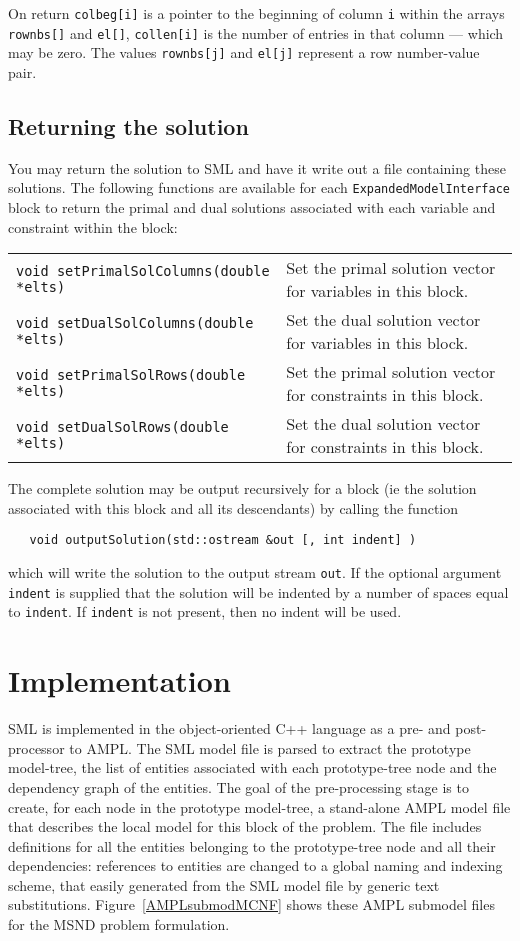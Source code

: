 \documentclass[10pt,a4paper]{book}
\begin{document}
\begin{verbtaim}
On return {\tt colbeg[i]} is a pointer to the beginning of column {\tt i}
within the arrays {\tt rownbs[]} and {\tt el[]}, {\tt collen[i]} is the number
of entries in that column --- which may be zero. The values {\tt rownbs[j]} and
{\tt el[j]} represent a row number-value pair.

\subsection{Returning the solution}
You may return the solution to SML and have it write out a file containing
these solutions. The following functions are available for each
{\tt ExpandedModelInterface} block to return the primal and dual solutions
associated with each variable and constraint within the block: \\
\begin{tabular}{ll}
{\tt void setPrimalSolColumns(double *elts)} & 
   Set the primal solution vector for variables in this block. \\
{\tt void setDualSolColumns(double *elts)} & 
   Set the dual solution vector for variables in this block. \\
{\tt void setPrimalSolRows(double *elts)} & 
   Set the primal solution vector for constraints in this block. \\
{\tt void setDualSolRows(double *elts)} & 
   Set the dual solution vector for constraints in this block.
\end{tabular}

The complete solution may be output recursively for a block (ie the solution
associated with this block and all its descendants) by calling the function
\begin{verbatim}
   void outputSolution(std::ostream &out [, int indent] )
\end{verbatim}
which will write the solution to the output stream {\tt out}. If the optional
argument {\tt indent} is supplied that the solution will be indented by a
number of spaces equal to {\tt indent}. If {\tt indent} is not present, then
no indent will be used.

\section{Implementation} \label{implementation}

SML is implemented in the object-oriented C++ language as a
pre- and post-processor to AMPL.  
The SML model file
is parsed to extract the prototype model-tree, the list of entities
associated with each prototype-tree node and the dependency graph of
the entities. 
The goal of the pre-processing stage is to create, for each node in the
prototype model-tree, a stand-alone AMPL model file that describes the
local model for this block of the problem. 
The file includes definitions for all the
entities belonging to the prototype-tree node and all their
dependencies: references to entities are changed to a
global naming and indexing scheme, that easily generated from the
SML model file by generic text substitutions.  
Figure~\ref{AMPLsubmodMCNF} shows these AMPL submodel files for the MSND problem formulation. 


\end{verbtaim}
\end{document}
